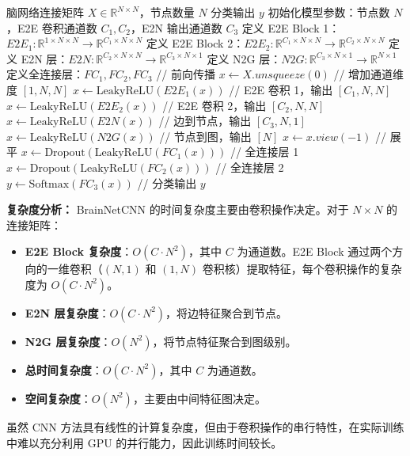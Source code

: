 \documentclass[12pt,a4paper]{article}
\begin{document}
\begin{algorithm}[H]
\caption{BrainNetCNN (E2E Model)}
\begin{algorithmic}[1]
\REQUIRE 脑网络连接矩阵 $X \in \mathbb{R}^{N \times N}$，节点数量 $N$
\ENSURE 分类输出 $y$
\STATE 初始化模型参数：节点数 $N$，E2E 卷积通道数 $C_1, C_2$，E2N 输出通道数 $C_3$
\STATE 定义 E2E Block 1：$E2E_1: \mathbb{R}^{1 \times N \times N} \rightarrow \mathbb{R}^{C_1 \times N \times N}$
\STATE 定义 E2E Block 2：$E2E_2: \mathbb{R}^{C_1 \times N \times N} \rightarrow \mathbb{R}^{C_2 \times N \times N}$
\STATE 定义 E2N 层：$E2N: \mathbb{R}^{C_2 \times N \times N} \rightarrow \mathbb{R}^{C_3 \times N \times 1}$
\STATE 定义 N2G 层：$N2G: \mathbb{R}^{C_3 \times N \times 1} \rightarrow \mathbb{R}^{N \times 1}$
\STATE 定义全连接层：$FC_1, FC_2, FC_3$
\STATE // 前向传播
\STATE $x \leftarrow X.unsqueeze(0)$ \quad // 增加通道维度 $[1, N, N]$
\STATE $x \leftarrow \text{LeakyReLU}(E2E_1(x))$ \quad // E2E 卷积 1，输出 $[C_1, N, N]$
\STATE $x \leftarrow \text{LeakyReLU}(E2E_2(x))$ \quad // E2E 卷积 2，输出 $[C_2, N, N]$
\STATE $x \leftarrow \text{LeakyReLU}(E2N(x))$ \quad // 边到节点，输出 $[C_3, N, 1]$
\STATE $x \leftarrow \text{LeakyReLU}(N2G(x))$ \quad // 节点到图，输出 $[N]$
\STATE $x \leftarrow x.view(-1)$ \quad // 展平
\STATE $x \leftarrow \text{Dropout}(\text{LeakyReLU}(FC_1(x)))$ \quad // 全连接层 1
\STATE $x \leftarrow \text{Dropout}(\text{LeakyReLU}(FC_2(x)))$ \quad // 全连接层 2
\STATE $y \leftarrow \text{Softmax}(FC_3(x))$ \quad // 分类输出
\RETURN $y$
\end{algorithmic}
\end{algorithm}

\textbf{复杂度分析：}
BrainNetCNN 的时间复杂度主要由卷积操作决定。对于 $N \times N$ 的连接矩阵：
\begin{itemize}
\item \textbf{E2E Block 复杂度}：$O(C \cdot N^2)$，其中 $C$ 为通道数。E2E Block 通过两个方向的一维卷积（$(N, 1)$ 和 $(1, N)$ 卷积核）提取特征，每个卷积操作的复杂度为 $O(C \cdot N^2)$。
\item \textbf{E2N 层复杂度}：$O(C \cdot N^2)$，将边特征聚合到节点。
\item \textbf{N2G 层复杂度}：$O(N^2)$，将节点特征聚合到图级别。
\item \textbf{总时间复杂度}：$O(C \cdot N^2)$，其中 $C$ 为通道数。
\item \textbf{空间复杂度}：$O(N^2)$，主要由中间特征图决定。
\end{itemize}

虽然 CNN 方法具有线性的计算复杂度，但由于卷积操作的串行特性，在实际训练中难以充分利用 GPU 的并行能力，因此训练时间较长。
\end{document}
